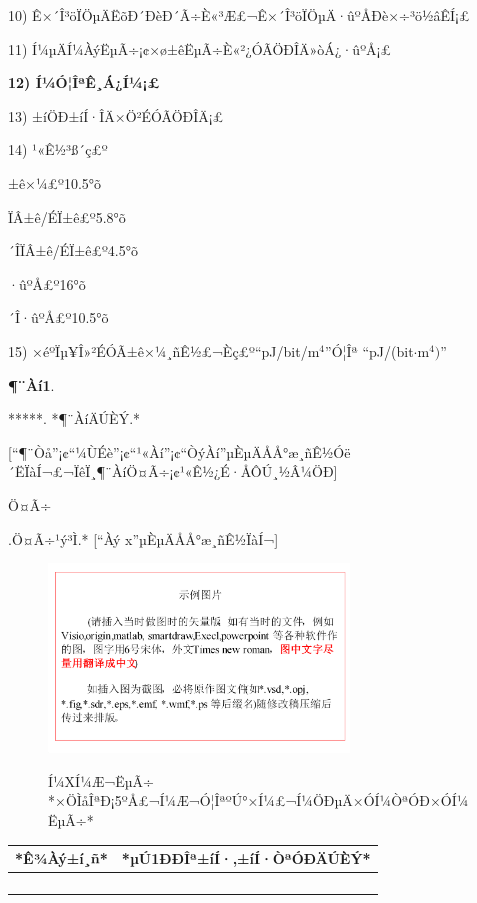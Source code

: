\documentclass[10.5pt,compsoc]{CjC}
\theoremstyle{mystyle}
\begin{document}
\begin{CJK*}{GBK}{song}
10) Ê×´Î³öÏÖµÄËõÐ´ÐèÐ´Ã÷È«³Æ£¬Ê×´Î³öÏÖµÄ·ûºÅÐè×÷³ö½âÊÍ¡£

11) Í¼µÄÍ¼ÀýËµÃ÷¡¢×ø±êËµÃ÷È«²¿ÓÃÖÐÎÄ»òÁ¿·ûºÅ¡£

\textbf{12) Í¼Ó¦ÎªÊ¸Á¿Í¼¡£}

13) ±íÖÐ±íÍ·ÎÄ×Ö²ÉÓÃÖÐÎÄ¡£

14) ¹«Ê½³ß´ç£º

±ê×¼£º10.5°õ

ÏÂ±ê/ÉÏ±ê£º5.8°õ

´ÎÏÂ±ê/ÉÏ±ê£º4.5°õ

·ûºÅ£º16°õ

´Î·ûºÅ£º10.5°õ

15) ×éºÏµ¥Î»²ÉÓÃ±ê×¼¸ñÊ½£¬Èç£º``pJ/bit/m$^{4}$''Ó¦Îª ``pJ/(bit$\cdot
$m$^{4})$''

{\begin{CJK*}{GBK}{hei}\textbf{¶¨Àí1}.\end{CJK*}}\quad ******. *¶¨ÀíÄÚÈÝ.*

[``¶¨Òå''¡¢``¼ÙÉè''¡¢``¹«Àí''¡¢``ÒýÀí''µÈµÄÅÅ°æ¸ñÊ½Óë´ËÏàÍ¬£¬ÏêÏ¸¶¨ÀíÖ¤Ã÷¡¢¹«Ê½¿É·ÅÔÚ¸½Â¼ÖÐ]

{\begin{CJK*}{GBK}{fs}Ö¤Ã÷\end{CJK*}}.\quad  *Ö¤Ã÷¹ý³Ì.* [``Àý x''µÈµÄÅÅ°æ¸ñÊ½ÏàÍ¬]


\begin{figure}[htbp]
\centerline{\includegraphics[width=3.15in,height=1.98in]{CJC1.pdf}}
Í¼X\quad  Í¼Æ¬ËµÃ÷ *×ÖÌåÎªÐ¡5ºÅ£¬Í¼Æ¬Ó¦ÎªºÚ°×Í¼£¬Í¼ÖÐµÄ×ÓÍ¼ÒªÓÐ×ÓÍ¼ËµÃ÷*
\label{fig1}
\end{figure}

\begin{table}[htbp]
\vspace {-2.5mm}
\begin{center}
\begin{tabular}{ll}
\toprule
*Ê¾Àý±í¸ñ*&*µÚ1ÐÐÎª±íÍ·,±íÍ·ÒªÓÐÄÚÈÝ* \\
\hline
&
 \\
&
 \\
&
 \\
&
 \\
\bottomrule
\end{tabular}
\label{tab1}
\end{center}
\end{table}


\end{CJK*}
\end{document}
